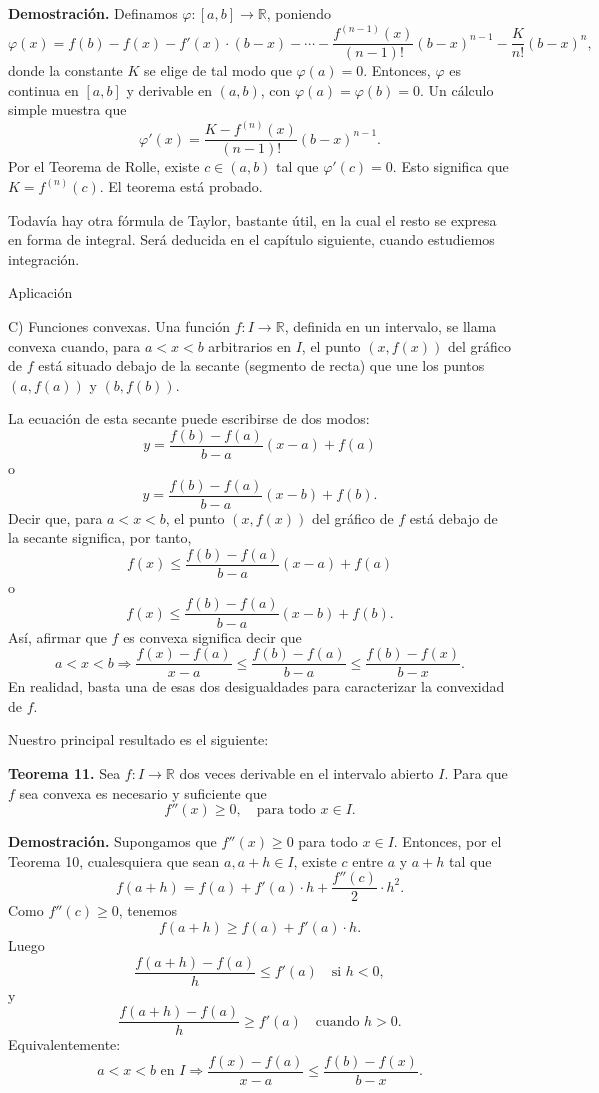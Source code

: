 \documentclass[12pt,oneside]{book}
\begin{document}
\textbf{Demostración.} Definamos \(\varphi: [a, b] \to \mathbb{R}\), poniendo
\[
\varphi(x) = f(b) - f(x) - f'(x) \cdot (b - x) - \cdots - \frac{f^{(n-1)}(x)}{(n-1)!}(b - x)^{n-1} - \frac{K}{n!}(b - x)^n,
\]
donde la constante \(K\) se elige de tal modo que \(\varphi(a) = 0\). Entonces, \(\varphi\) es continua en \([a, b]\) y derivable en \((a, b)\), con \(\varphi(a) = \varphi(b) = 0\). Un cálculo simple muestra que
\[
\varphi'(x) = \frac{K - f^{(n)}(x)}{(n-1)!}(b - x)^{n-1}.
\]
Por el Teorema de Rolle, existe \(c \in (a, b)\) tal que \(\varphi'(c) = 0\). Esto significa que \(K = f^{(n)}(c)\). El teorema está probado.

Todavía hay otra fórmula de Taylor, bastante útil, en la cual el resto se expresa en forma de integral. Será deducida en el capítulo siguiente, cuando estudiemos integración.

Aplicación

C) Funciones convexas. Una función \(f: I \to \mathbb{R}\), definida en un intervalo, se llama convexa cuando, para \(a < x < b\) arbitrarios en \(I\), el punto \((x, f(x))\) del gráfico de \(f\) está situado debajo de la secante (segmento de recta) que une los puntos \((a, f(a))\) y \((b, f(b))\).

La ecuación de esta secante puede escribirse de dos modos:
\[
y = \frac{f(b) - f(a)}{b - a}(x - a) + f(a)
\]
o
\[
y = \frac{f(b) - f(a)}{b - a}(x - b) + f(b).
\]
Decir que, para \(a < x < b\), el punto \((x, f(x))\) del gráfico de \(f\) está debajo de la secante significa, por tanto,
\[
f(x) \leq \frac{f(b) - f(a)}{b - a}(x - a) + f(a)
\]
o
\[
f(x) \leq \frac{f(b) - f(a)}{b - a}(x - b) + f(b).
\]
Así, afirmar que \(f\) es convexa significa decir que
\[
a < x < b \Rightarrow \frac{f(x) - f(a)}{x - a} \leq \frac{f(b) - f(a)}{b - a} \leq \frac{f(b) - f(x)}{b - x}.
\]
En realidad, basta una de esas dos desigualdades para caracterizar la convexidad de \( f \).

Nuestro principal resultado es el siguiente:

\textbf{Teorema 11.} Sea \( f: I \to \mathbb{R} \) dos veces derivable en el intervalo abierto \( I \). Para que \( f \) sea convexa es necesario y suficiente que
\[
f''(x) \geq 0, \quad \text{para todo } x \in I.
\]

\textbf{Demostración.} Supongamos que \( f''(x) \geq 0 \) para todo \( x \in I \). Entonces, por el Teorema 10, cualesquiera que sean \( a, a + h \in I \), existe \( c \) entre \( a \) y \( a + h \) tal que
\[
f(a + h) = f(a) + f'(a) \cdot h + \frac{f''(c)}{2} \cdot h^2.
\]
Como \( f''(c) \geq 0 \), tenemos
\[
f(a + h) \geq f(a) + f'(a) \cdot h.
\]
Luego
\[
\frac{f(a + h) - f(a)}{h} \leq f'(a) \quad \text{si } h < 0,
\]
y
\[
\frac{f(a + h) - f(a)}{h} \geq f'(a) \quad \text{cuando } h > 0.
\]
Equivalentemente:
\[
a < x < b \text{ en } I \Rightarrow \frac{f(x) - f(a)}{x - a} \leq \frac{f(b) - f(x)}{b - x}.
\]
\end{document}
